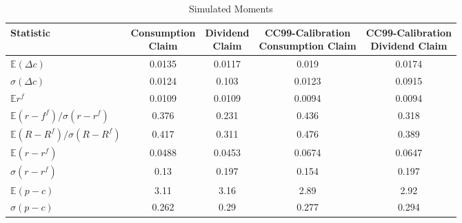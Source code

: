 \begin{table}[H]
\centering
\caption{Simulated Moments}
\label{tab:simmom}
\begin{adjustbox}{max width=\textwidth}
\begin{tabular}{@{}lcccc@{}}
\toprule
Statistic                                               & \makecell{Consumption \\ Claim} & \makecell{Dividend \\ Claim} & \makecell{CC99-Calibration \\ Consumption Claim} & \makecell{CC99-Calibration\\ Dividend Claim} \\ \midrule
$\mathbb{E}\left(\Delta c \right)$                      &0.0135&0.0117&0.019&0.0174\\
$\sigma\left(\Delta c \right)$                          &0.0124&0.103&0.0123&0.0915\\
$\mathbb{E}r^f$                                         &0.0109&0.0109&0.0094&0.0094\\
$\mathbb{E}\left(r-f^f\right)/\sigma\left(r-r^f\right)$ &0.376&0.231& 0.436                                       &         0.318                            \\
$\mathbb{E}\left(R-R^f\right)/\sigma\left(R-R^f\right)$ & 0.417   & 0.311               &  0.476                                      &      0.389                               \\
$\mathbb{E}\left(r-r^f\right)$                          &  0.0488                 &      0.0453          &         0.0674                               &        0.0647                             \\
$\sigma\left(r-r^f\right)$                              &     0.13              &       0.197           &   0.154                                       &                  0.197                     \\
$\mathbb{E}\left(p-c\right)$                          &     3.11                &      3.16            &         2.89                                 &             2.92                          \\
$\sigma\left(p-c\right)$                              &       0.262            &      0.29          &   0.277                                     & 0.294                                    \\ \bottomrule
\end{tabular}
\end{adjustbox}
\end{table}
